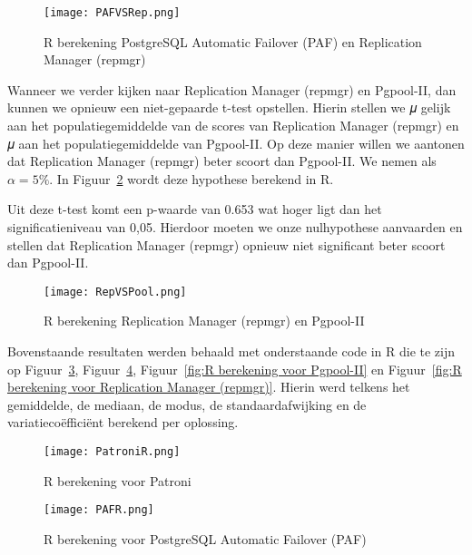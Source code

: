 \begin{figure}[!h]
    \centering
    \texttt{[image: PAFVSRep.png]}
    \caption{R berekening PostgreSQL Automatic Failover (PAF) en Replication Manager (repmgr)}
    \label{fig:R berekening PostgreSQL Automatic Failover (PAF) en Replication Manager (repmgr)}
\end{figure}

Wanneer we verder kijken naar Replication Manager (repmgr) en Pgpool-II, dan kunnen we opnieuw een niet-gepaarde t-test opstellen. Hierin stellen we 𝜇 gelijk aan het populatiegemiddelde van de scores van Replication Manager (repmgr) en 𝜇 aan het populatiegemiddelde van Pgpool-II. Op deze manier willen we aantonen dat Replication Manager (repmgr) beter scoort dan Pgpool-II. We nemen als $\alpha = 5\%$. In Figuur~\ref{fig:R berekening Replication Manager (repmgr) en Pgpool-II} wordt deze hypothese berekend in R.

Uit deze t-test komt een p-waarde van 0.653 wat hoger ligt dan het significatieniveau van 0,05. Hierdoor moeten we onze nulhypothese aanvaarden en stellen dat Replication Manager (repmgr) opnieuw niet significant beter scoort dan Pgpool-II.

\begin{figure}[!h]
    \centering
    \texttt{[image: RepVSPool.png]}
    \caption{R berekening Replication Manager (repmgr) en Pgpool-II}
    \label{fig:R berekening Replication Manager (repmgr) en Pgpool-II}
\end{figure}


Bovenstaande resultaten werden behaald met onderstaande code in R die te zijn op Figuur~\ref{fig:R berekening voor Patroni}, Figuur~\ref{fig:R berekening voor PostgreSQL Automatic Failover (PAF)}, Figuur~\ref{fig:R berekening voor Pgpool-II} en Figuur~\ref{fig:R berekening voor Replication Manager (repmgr)}. Hierin werd telkens het gemiddelde, de mediaan, de modus, de standaardafwijking en de variatiecoëfficiënt berekend per oplossing.

\begin{figure}[!h]
    \centering
    \texttt{[image: PatroniR.png]}
    \caption{R berekening voor Patroni}
    \label{fig:R berekening voor Patroni}
\end{figure}

\begin{figure}[!h]
    \centering
    \texttt{[image: PAFR.png]}
    \caption{R berekening voor PostgreSQL Automatic Failover (PAF)}
    \label{fig:R berekening voor PostgreSQL Automatic Failover (PAF)}
\end{figure}

